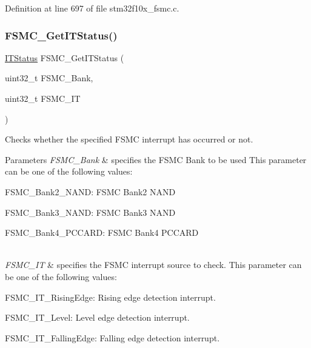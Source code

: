 Definition at line 697 of file stm32f10x\+\_\+fsmc.\+c.

\mbox{\label{group___f_s_m_c___private___functions_ga7fce9ca889d33cd8b8b7413875dd4d73}} 
\subsubsection{\texorpdfstring{F\+S\+M\+C\+\_\+\+Get\+I\+T\+Status()}{FSMC\_GetITStatus()}}
{\footnotesize\ttfamily \hyperlink{group___exported__types_gaacbd7ed539db0aacd973a0f6eca34074}{I\+T\+Status} F\+S\+M\+C\+\_\+\+Get\+I\+T\+Status (\begin{DoxyParamCaption}\item[{uint32\+\_\+t}]{F\+S\+M\+C\+\_\+\+Bank,  }\item[{uint32\+\_\+t}]{F\+S\+M\+C\+\_\+\+IT }\end{DoxyParamCaption})}



Checks whether the specified F\+S\+MC interrupt has occurred or not. 


\begin{DoxyParams}{Parameters}
{\em F\+S\+M\+C\+\_\+\+Bank} & specifies the F\+S\+MC Bank to be used This parameter can be one of the following values\+: \begin{DoxyItemize}
\item F\+S\+M\+C\+\_\+\+Bank2\+\_\+\+N\+A\+ND\+: F\+S\+MC Bank2 N\+A\+ND \item F\+S\+M\+C\+\_\+\+Bank3\+\_\+\+N\+A\+ND\+: F\+S\+MC Bank3 N\+A\+ND \item F\+S\+M\+C\+\_\+\+Bank4\+\_\+\+P\+C\+C\+A\+RD\+: F\+S\+MC Bank4 P\+C\+C\+A\+RD \end{DoxyItemize}
\\
\hline
{\em F\+S\+M\+C\+\_\+\+IT} & specifies the F\+S\+MC interrupt source to check. This parameter can be one of the following values\+: \begin{DoxyItemize}
\item F\+S\+M\+C\+\_\+\+I\+T\+\_\+\+Rising\+Edge\+: Rising edge detection interrupt. \item F\+S\+M\+C\+\_\+\+I\+T\+\_\+\+Level\+: Level edge detection interrupt. \item F\+S\+M\+C\+\_\+\+I\+T\+\_\+\+Falling\+Edge\+: Falling edge detection interrupt. \end{DoxyItemize}
\\
\hline
\end{DoxyParams}

